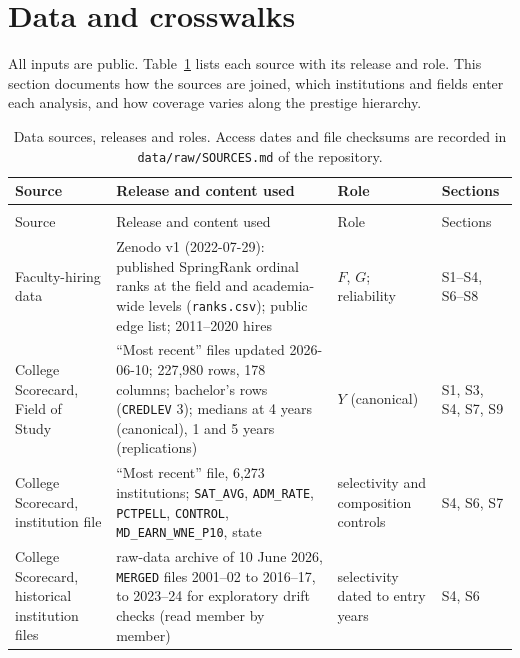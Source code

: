 \documentclass[11pt]{article}
\begin{document}
\clearpage
\section{Data and crosswalks}\label{sec:data}

All inputs are public. Table~\ref{tab:sources} lists each source with its release and role. This section
documents how the sources are joined, which institutions and fields enter each analysis, and how coverage
varies along the prestige hierarchy.

{\footnotesize
\begin{longtable}{@{}>{\raggedright\arraybackslash}p{3.0cm}>{\raggedright\arraybackslash}p{5.4cm}>{\raggedright\arraybackslash}p{3.0cm}>{\raggedright\arraybackslash}p{3.6cm}@{}}
\caption{Data sources, releases and roles. Access dates and file checksums are recorded in
\texttt{data/raw/SOURCES.md} of the repository.}\label{tab:sources}\\
\toprule
Source & Release and content used & Role & Sections \\
\midrule
\endfirsthead
\multicolumn{4}{@{}l}{\small Table~\ref{tab:sources} (continued)}\\
\toprule
Source & Release and content used & Role & Sections \\
\midrule
\endhead
\bottomrule
\endfoot
Faculty-hiring data \citep{wapman2022data} & Zenodo v1 (2022-07-29): published SpringRank ordinal ranks at the field and academia-wide levels (\texttt{ranks.csv}); public edge list; 2011--2020 hires & $F$, $G$; reliability & S1--S4, S6--S8 \\
College Scorecard, Field of Study \citep{scorecard} & ``Most recent'' files updated 2026-06-10; 227,980 rows, 178 columns; bachelor's rows (\texttt{CREDLEV} 3); medians at 4 years (canonical), 1 and 5 years (replications) & $Y$ (canonical) & S1, S3, S4, S7, S9 \\
College Scorecard, institution file \citep{scorecard} & ``Most recent'' file, 6,273 institutions; \texttt{SAT\_AVG}, \texttt{ADM\_RATE}, \texttt{PCTPELL}, \texttt{CONTROL}, \texttt{MD\_EARN\_WNE\_P10}, state & selectivity and composition controls & S4, S6, S7 \\
College Scorecard, historical institution files \citep{scorecard} & raw-data archive of 10 June 2026, \texttt{MERGED} files 2001--02 to 2016--17, to 2023--24 for exploratory drift checks (read member by member) & selectivity dated to entry years & S4, S6 \\

\end{longtable}}
\end{document}
